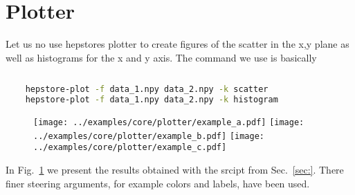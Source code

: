 
\section{Plotter}
Let us no use hepstores plotter to create figures of the scatter in
the x,y plane as well as histograms for the x and y axis. The command
we use is basically
%
\begin{changemargin}{1.5cm}{1.5cm} 
  \begin{lstlisting}[language=Bash]
    
    hepstore-plot -f data_1.npy data_2.npy -k scatter
    hepstore-plot -f data_1.npy data_2.npy -k histogram
  \end{lstlisting}
\end{changemargin}
%
%
\begin{figure}
  \centering
  \texttt{[image: ../examples/core/plotter/example\_a.pdf]}
  \texttt{[image: ../examples/core/plotter/example\_b.pdf]}
  \texttt{[image: ../examples/core/plotter/example\_c.pdf]}
  \caption{}
  \label{fig:example_plotting}
\end{figure}
%
In Fig.~\ref{fig:example_plotting} we present the results obtained
with the srcipt from Sec.~\ref{sec:}. There finer steering arguments,
for example colors and labels, have been used.


